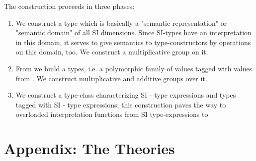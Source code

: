 \documentclass[11pt,a4paper]{book}
\begin{document}
The construction proceeds in three phases:
\begin{enumerate}%
\item We construct a type  which is basically a "semantic representation" or
"semantic domain" of all SI dimensions. Since SI-types have an interpretation in this domain,
it serves to give semantics to type-constructors by operations on this domain, too.
We construct a multiplicative group on it.

\item From  we build a   types, i.e. a polymorphic family of values
tagged with values from . We construct multiplicative and additive
groups over it.

\item We construct a type-class characterizing SI - type expressions
and types tagged with SI - type expressions; this construction paves the
way to overloaded interpretation functions from SI type-expressions to
\end{enumerate}%



\chapter{Appendix: The Theories}





\end{document}

